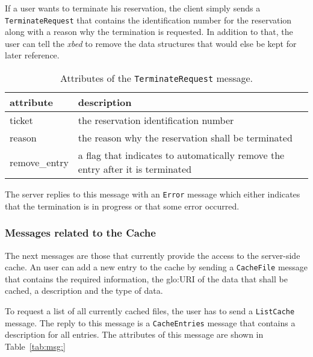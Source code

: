 If a  user wants to terminate  his reservation, the client  simply sends a
\texttt{TerminateRequest} that contains  the identification number for the
reservation  along with  a reason  why the  termination is  requested.  In
addition to  that, the user  can tell the  \emph{xbed} to remove  the data
structures that would else be kept for later reference.


\begin{table}[ht]
  \centering
  \begin{tabular}{@{}lp{}@{}}\toprule
    attribute        & \multicolumn{1}{l}{description} \\ \midrule %
    ticket           & the reservation identification number \\
    reason           & the reason why the reservation shall be terminated \\
    remove\_entry    & a flag that indicates to automatically remove the entry after it is terminated \\
    \bottomrule
  \end{tabular}
  \caption{Attributes of the \texttt{TerminateRequest} message.}
  \label{tab:msg:terminate-request}
\end{table}

The server  replies to this  message with an \texttt{Error}  message which
either indicates  that the termination is  in progress or  that some error
occurred.

\subsubsection{Messages related to the Cache}

The  next messages  are those  that currently  provide the  access  to the
server-side cache. An user  can add a new entry to the  cache by sending a
\texttt{CacheFile} message that contains the required information, \ie the
\gls{glo:URI} of the data that shall be cached, a description and the type
of data.

To request a  list of all currently  cached files, the user has  to send a
\texttt{ListCache}   message.    The   reply   to  this   message   is   a
\texttt{CacheEntries} message that contains a description for all entries.
The attributes of this message are shown in Table~\ref{tab:msg:}

